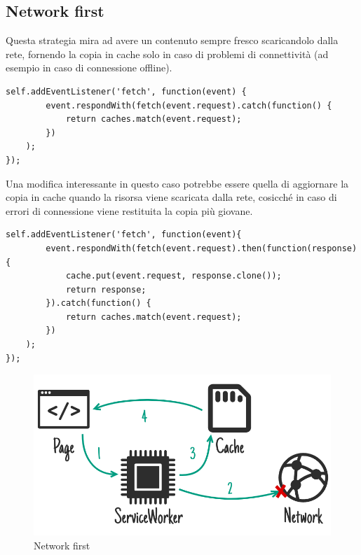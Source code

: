 \documentclass[11pt ,a4paper , twoside , openright ]{article}
\begin{document}
\subsection{Network first}
Questa strategia mira ad avere un contenuto sempre fresco scaricandolo dalla rete, fornendo la copia in cache solo in caso di problemi di connettività (ad esempio in caso di connessione offline).
\begin{lstlisting}
self.addEventListener('fetch', function(event) { 
		event.respondWith(fetch(event.request).catch(function() { 
			return caches.match(event.request); 
		}) 
	);
});
\end{lstlisting}
Una modifica interessante in questo caso potrebbe essere quella di aggiornare la copia in cache quando la risorsa viene scaricata dalla rete, cosicché in caso di errori di connessione viene restituita la copia più giovane.
\begin{lstlisting}
self.addEventListener('fetch', function(event){ 
		event.respondWith(fetch(event.request).then(function(response) { 		
			cache.put(event.request, response.clone()); 
			return response; 
		}).catch(function() { 
			return caches.match(event.request); 
		}) 
	);
});
\end{lstlisting}
\begin{figure}[h]
	\centering
	\includegraphics[width=1\linewidth]{Strategia1}
	\caption{Network first}
	\label{fig: Network first}
\end{figure}
\pagebreak
\end{document}
